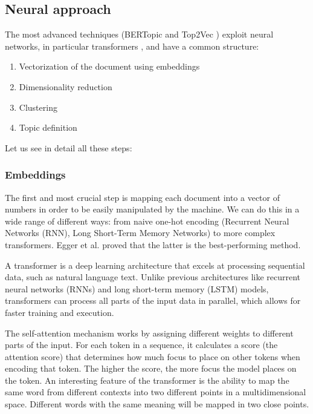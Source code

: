 \subsection{Neural approach}

The most advanced techniques (BERTopic \cite{grootendorst_bertopic_2022}and Top2Vec \cite{angelov_top2vec_2020})  exploit neural networks, in particular transformers \cite{vaswani_attention_2017}, and have a common structure: 

\begin{enumerate}
    \item Vectorization of the document using embeddings
    \item Dimensionality reduction
    \item Clustering
    \item Topic definition
\end{enumerate}

Let us see in detail all these steps:

\subsubsection{Embeddings}

The first and most crucial step is mapping each document into a vector of numbers in order to be easily manipulated by the machine. We can do this in a wide range of different ways: from naive one-hot encoding (Recurrent Neural Networks (RNN), Long Short-Term Memory Networks) to more complex transformers. Egger et al. \cite{egger_topic_2022} proved that the latter is the best-performing method.

A transformer \cite{vaswani_attention_2017}  is a deep learning architecture that excels at processing sequential data, such as natural language text. Unlike previous architectures like recurrent neural networks (RNNs) and long short-term memory (LSTM) models, transformers can process all parts of the input data in parallel, which allows for faster training and execution.

The self-attention mechanism works by assigning different weights to different parts of the input. For each token in a sequence, it calculates a score (the attention score) that determines how much focus to place on other tokens when encoding that token. The higher the score, the more focus the model places on the token. An interesting feature of the transformer is the ability to map the same word from different contexts into two different points in a multidimensional space. Different words with the same meaning will be mapped in two close points.

